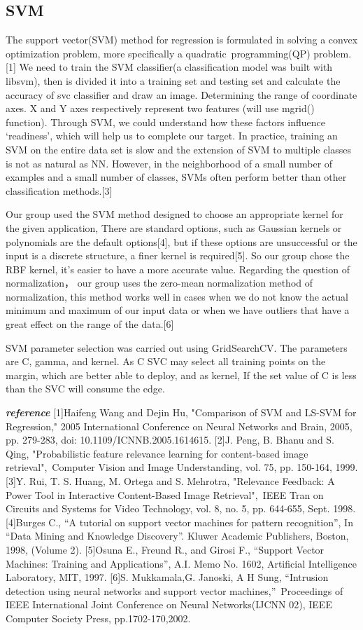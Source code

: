 \subsection{SVM}\label{subsubsec4}
The support vector(SVM) method for regression is formulated in solving a convex optimization problem, more specifically a quadratic programming(QP) problem.[1] We need to train the SVM classifier(a classification model was built with libsvm), then is divided it into a training set and testing set and calculate the accuracy of svc classifier and draw an image. Determining the range of coordinate axes. X and Y axes respectively represent two features (will use mgrid() function). Through SVM, we could understand how these factors influence ‘readiness’, which will help us to complete our target. In practice, training an SVM on the entire data set is slow and the extension of SVM to multiple classes is not as natural as NN. However, in the neighborhood of a small number of examples and a small number of classes, SVMs often perform better than other classification methods.[3]

Our group used the SVM method designed to choose an appropriate kernel for the given application, There are standard options, such as Gaussian kernels or polynomials are the default options[4], but if these options are unsuccessful or the input is a discrete structure, a finer kernel is required[5]. So our group chose the RBF kernel, it’s easier to have a more accurate value. Regarding the question of normalization， our group uses the zero-mean normalization method of normalization, this method works well in cases when we do not know the actual minimum and maximum of our input data or when we have outliers that have a great effect on the range of the data.[6]

SVM parameter selection was carried out using GridSearchCV.
The parameters are C, gamma, and kernel. As C SVC may select all training points on the margin, which are better able to deploy, and as kernel, If the set value of C is less than the SVC will consume the edge.

\textit{\textbf{reference}}
[1]Haifeng Wang and Dejin Hu, "Comparison of SVM and LS-SVM for Regression," 2005 International Conference on Neural Networks and Brain, 2005, pp. 279-283, doi: 10.1109/ICNNB.2005.1614615.
[2]J. Peng, B. Bhanu and S. Qing, "Probabilistic feature relevance learning for content-based image retrieval", Computer Vision and Image Understanding, vol. 75, pp. 150-164, 1999.
[3]Y. Rui, T. S. Huang, M. Ortega and S. Mehrotra, "Relevance Feedback: A Power Tool in Interactive Content-Based Image Retrieval", IEEE Tran on Circuits and Systems for Video Technology, vol. 8, no. 5, pp. 644-655, Sept. 1998.
[4]Burges C., “A tutorial on support vector machines for pattern recognition”, In “Data Mining and Knowledge Discovery”. Kluwer Academic Publishers, Boston, 1998, (Volume 2). 
[5]Osuna E., Freund R., and Girosi F., “Support Vector Machines: Training and Applications”, A.I. Memo No. 1602, Artificial Intelligence Laboratory, MIT, 1997.
[6]S. Mukkamala,G. Janoski, A H Sung, “Intrusion detection using neural networks and support vector machines,” Proceedings of IEEE International Joint Conference on Neural Networks(IJCNN 02), IEEE Computer Society Press, pp.1702-170,2002.
